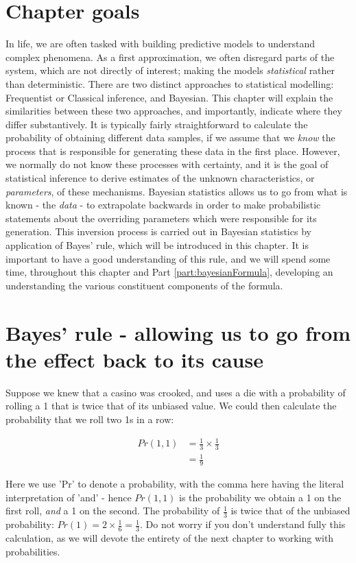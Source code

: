 \documentclass[11pt,fullpage]{book}
\begin{document}
\section{Chapter goals}
In life, we are often tasked with building predictive models to understand complex phenomena. As a first approximation, we often disregard parts of the system, which are not directly of interest; making the models \textit{statistical} rather than deterministic. There are two distinct approaches to statistical modelling: Frequentist or Classical inference, and Bayesian. This chapter will explain the similarities between these two approaches, and importantly, indicate where they differ substantively. It is typically fairly straightforward to calculate the probability of obtaining different data samples, if we assume that we \textit{know} the process that is responsible for generating these data in the first place. However, we normally do not know these processes with certainty, and it is the goal of statistical inference to derive estimates of the unknown characteristics, or \textit{parameters}, of these mechanisms. Bayesian statistics allows us to go from what is known - the \textit{data} - to extrapolate backwards in order to make probabilistic statements about the overriding parameters which were responsible for its generation. This inversion process is carried out in Bayesian statistics by application of Bayes' rule, which will be introduced in this chapter.  It is important to have a good understanding of this rule, and we will spend some time, throughout this chapter and Part \ref{part:bayesianFormula}, developing an understanding the various constituent components of the formula.

\section{Bayes' rule - allowing us to go from the effect back to its cause}\label{sec:Intro_bayesCauseEffect}
Suppose we knew that a casino was crooked, and uses a die with a probability of rolling a 1 that is twice that of its unbiased value. We could then calculate the probability that we roll two 1s in a row:

\begin{align}\label{eq:Intro_crookedCasinoBayes}
Pr(1,1) &= \frac{1}{3} \times \frac{1}{3}\\
&= \frac{1}{9}
\end{align}


Here we use 'Pr' to denote a probability, with the comma here having the literal interpretation of 'and' - hence $Pr(1,1)$ is the probability we obtain a 1 on the first roll, \textit{and} a 1 on the second. The probability of $\frac{1}{3}$ is twice that of the unbiased probability: $Pr(1) = 2\times\frac{1}{6} = \frac{1}{3}$. Do not worry if you don't understand fully this calculation, as we will devote the entirety of the next chapter to working with probabilities.
\end{document}
